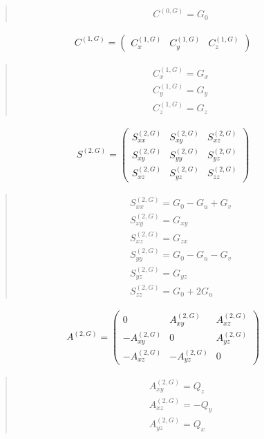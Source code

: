 \documentclass[fleqn,10pt]{jsarticle}
\begin{document}
\begin{quote}
\begin{align*}
& C^{(0,G)} = G_{0}
\end{align*}
\end{quote}
\begin{align*}
C^{(1,G)} = \begin{pmatrix} C^{(1,G)}_{x} & C^{(1,G)}_{y} & C^{(1,G)}_{z} \end{pmatrix}
\end{align*}
\begin{quote}
\begin{align*}
& C^{(1,G)}_{x} = G_{x} \\
& C^{(1,G)}_{y} = G_{y} \\
& C^{(1,G)}_{z} = G_{z}
\end{align*}
\end{quote}
\begin{align*}
S^{(2,G)} = \begin{pmatrix} S^{(2,G)}_{xx} & S^{(2,G)}_{xy} & S^{(2,G)}_{xz} \\ S^{(2,G)}_{xy} & S^{(2,G)}_{yy} & S^{(2,G)}_{yz} \\ S^{(2,G)}_{xz} & S^{(2,G)}_{yz} & S^{(2,G)}_{zz} \end{pmatrix}
\end{align*}
\begin{quote}
\begin{align*}
& S^{(2,G)}_{xx} = G_{0} - G_{u} + G_{v} \\
& S^{(2,G)}_{xy} = G_{xy} \\
& S^{(2,G)}_{xz} = G_{zx} \\
& S^{(2,G)}_{yy} = G_{0} - G_{u} - G_{v} \\
& S^{(2,G)}_{yz} = G_{yz} \\
& S^{(2,G)}_{zz} = G_{0} + 2 G_{u}
\end{align*}
\end{quote}
\begin{align*}
A^{(2,G)} = \begin{pmatrix} 0 & A^{(2,G)}_{xy} & A^{(2,G)}_{xz} \\ - A^{(2,G)}_{xy} & 0 & A^{(2,G)}_{yz} \\ - A^{(2,G)}_{xz} & - A^{(2,G)}_{yz} & 0 \end{pmatrix}
\end{align*}
\begin{quote}
\begin{align*}
& A^{(2,G)}_{xy} = Q_{z} \\
& A^{(2,G)}_{xz} = - Q_{y} \\
& A^{(2,G)}_{yz} = Q_{x}
\end{align*}
\end{quote}
\end{document}
